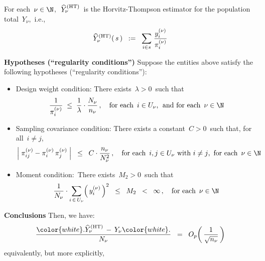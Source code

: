 \begin{theorem}
\begin{itemize}
    For each \,$\nu\in\N$,\,
    \,$\widehat{Y}^{\textnormal{(HT)}}_{\nu}$\,
    is the Horvitz-Thompson estimator for the population total \,$Y_{\nu}$,\, i.e.,
    \begin{equation*}
    \widehat{Y}^{\textnormal{(HT)}}_{\nu}(\,s\,)
    \;\; := \;\;
        \underset{i \in s}{\sum}\;
        \dfrac{ y^{(\nu)}_{i} }{ \pi^{(\nu)}_{i} }
    \end{equation*}
\end{itemize}
\vskip 0.2cm
\noindent
\textbf{Hypotheses (``regularity conditions'')}
\vskip 0.1cm
\noindent
Suppose the entities above satisfy the following hypotheses (``regularity conditions''):
\begin{itemize}
\item
    Design weight condition:
    There exists \,$\lambda > 0$\,
    such that
    \begin{equation*}
    \dfrac{1}{\pi^{(\nu)}_{i}}
    \;\leq\;
        \dfrac{1}{\lambda}
        \cdot
        \dfrac{N_{\nu}}{n_{\nu}}\,,
    \quad
    \textnormal{for each \,$i \in U_{\nu}$,\; and for each \,$\nu \in \N$}
    \end{equation*}
\item
    Sampling covariance condition:
    There exists a constant \,$C > 0$\, such that,
    for all \,$i \neq j$,\,
    \begin{equation*}
    \left\vert\; \pi^{(\nu)}_{ij} - \pi^{(\nu)}_{i}\,\pi^{(\nu)}_{j} \;\right\vert
    \;\; \leq \;\;
        C\cdot\dfrac{n_{\nu}}{N_{\nu}^{2}}\,,
    \quad
    \textnormal{for each \,$i,j \in U_{\nu}$ with $i \neq j$,\, for each \,$\nu\in\N$}
    \end{equation*}
\item
    Moment condition:\,
    There exists \,$M_{2} > 0$\, such that
    \begin{equation*}
    \dfrac{1}{N_{\nu}}\cdot\underset{i\,\in\,U_{\nu}}{\sum}\!\left(\,y^{(\nu)}_{i}\,\right)^{2}
    \;\; \leq \;\; M_{2} \;\; < \;\; \infty\,,
    \quad
    \textnormal{for each \,$\nu\in\N$}
    \end{equation*}
\end{itemize}
\vskip 0.2cm
\noindent
\textbf{Conclusions}
\vskip 0.1cm
\noindent
Then, we have:
\begin{equation*}
\dfrac{
    {\color{white}.}
    \widehat{Y}^{\textnormal{(HT)}}_{\nu} \,-\, Y_{\nu}
    {\color{white}.}
    }{
    N_{\nu}
    }
\;\; = \;\;
    O_{p}\!\left(\,\dfrac{1}{\sqrt{n_{\nu}}}\,\right)
\end{equation*}
equivalently, but more explicitly,

\end{theorem}
